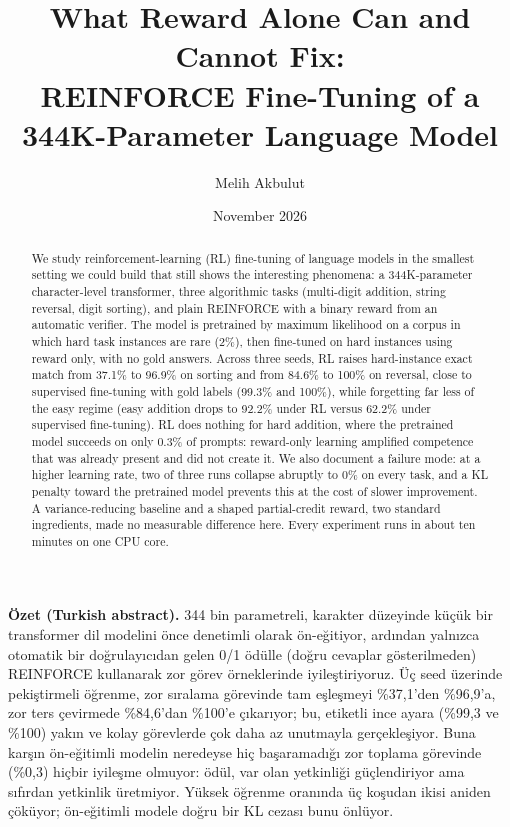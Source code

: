 \documentclass[10pt,twocolumn]{article}
\title{\textbf{What Reward Alone Can and Cannot Fix:\\ REINFORCE Fine-Tuning of a 344K-Parameter Language Model}}
\author{Melih Akbulut}
\date{November 2026}
\begin{document}
\maketitle

\begin{abstract}
We study reinforcement-learning (RL) fine-tuning of language models in the smallest setting we could
build that still shows the interesting phenomena: a 344K-parameter character-level transformer,
three algorithmic tasks (multi-digit addition, string reversal, digit sorting), and plain REINFORCE
with a binary reward from an automatic verifier. The model is pretrained by maximum likelihood on a
corpus in which hard task instances are rare (2\%), then fine-tuned on hard instances using reward
only, with no gold answers. Across three seeds, RL raises hard-instance exact match from
37.1\% to 96.9\% on sorting and from 84.6\% to 100\% on reversal, close to supervised fine-tuning
with gold labels (99.3\% and 100\%), while forgetting far less of the easy regime (easy addition
drops to 92.2\% under RL versus 62.2\% under supervised fine-tuning). RL does nothing for hard
addition, where the pretrained model succeeds on only 0.3\% of prompts: reward-only learning amplified
competence that was already present and did not create it. We also document a failure mode: at a
higher learning rate, two of three runs collapse abruptly to 0\% on every task, and a KL penalty
toward the pretrained model prevents this at the cost of slower improvement. A variance-reducing
baseline and a shaped partial-credit reward, two standard ingredients, made no measurable difference
here. Every experiment runs in about ten minutes on one CPU core.
\end{abstract}

\noindent\textbf{Özet (Turkish abstract).}
{\small 344 bin parametreli, karakter düzeyinde küçük bir transformer dil modelini önce denetimli
olarak ön-eğitiyor, ardından yalnızca otomatik bir doğrulayıcıdan gelen 0/1 ödülle (doğru cevaplar
gösterilmeden) REINFORCE kullanarak zor görev örneklerinde iyileştiriyoruz. Üç seed üzerinde
pekiştirmeli öğrenme, zor sıralama görevinde tam eşleşmeyi \%37,1'den \%96,9'a, zor ters çevirmede
\%84,6'dan \%100'e çıkarıyor; bu, etiketli ince ayara (\%99,3 ve \%100) yakın ve kolay görevlerde
çok daha az unutmayla gerçekleşiyor. Buna karşın ön-eğitimli modelin neredeyse hiç başaramadığı zor
toplama görevinde (\%0,3) hiçbir iyileşme olmuyor: ödül, var olan yetkinliği güçlendiriyor ama
sıfırdan yetkinlik üretmiyor. Yüksek öğrenme oranında üç koşudan ikisi aniden çöküyor; ön-eğitimli
modele doğru bir KL cezası bunu önlüyor.}
\end{document}
